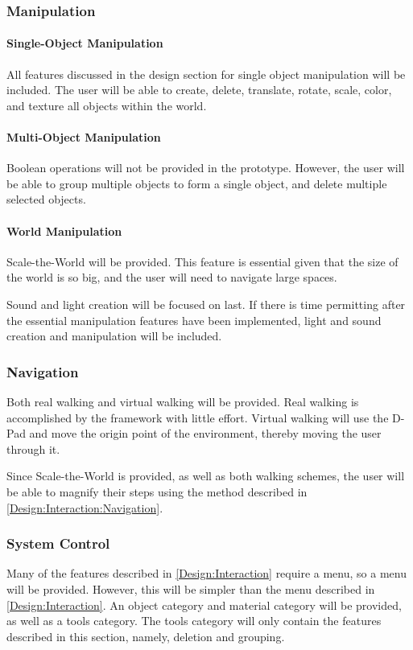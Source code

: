 \subsubsection{Manipulation}
\paragraph{Single-Object Manipulation}
All features discussed in the design section for single object manipulation will be included.
The user will be able to create, delete, translate, rotate, scale, color, and texture all objects within the world.

\paragraph{Multi-Object Manipulation}
Boolean operations will not be provided in the prototype.
However, the user will be able to group multiple objects to form a single object, and delete multiple selected objects.

\paragraph{World Manipulation}
Scale-the-World will be provided.
This feature is essential given that the size of the world is so big, and the user will need to navigate large spaces.

Sound and light creation will be focused on last.
If there is time permitting after the essential manipulation features have been implemented, light and sound creation and manipulation will be included.

\subsubsection{Navigation}
Both real walking and virtual walking will be provided.
Real walking is accomplished by the framework with little effort.
Virtual walking will use the D-Pad and move the origin point of the environment, thereby moving the user through it.

Since Scale-the-World is provided, as well as both walking schemes, the user will be able to magnify their steps using the method described in \ref{Design:Interaction:Navigation}.

\subsubsection{System Control}
Many of the features described in \ref{Design:Interaction} require a menu, so a menu will be provided.
However, this will be simpler than the menu described in \ref{Design:Interaction}.
An object category and material category will be provided, as well as a tools category.
The tools category will only contain the features described in this section, namely, deletion and grouping.

